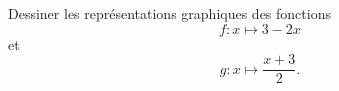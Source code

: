 
\begin{exercice}\label{exosmath-0233}

Dessiner les représentations graphiques des fonctions
\begin{equation}
    f\colon x\mapsto 3-2x
\end{equation}
et
\begin{equation}
    g\colon x\mapsto \frac{ x+3 }{2}.
\end{equation}

\end{exercice}
